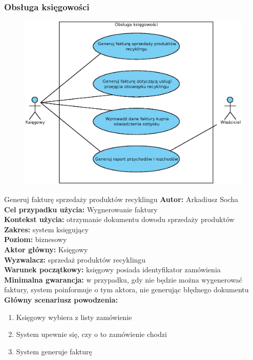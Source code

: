 \subsubsection{Obsługa księgowości}
	\begin{figure}[H]
		\centering
		\includegraphics[width=\textwidth]{img/UC/ksiegowosc.eps}
	\end{figure}

	\begin{usecase}{Generuj fakturę sprzedaży produktów recyklingu}
		\textbf{Autor:} Arkadiusz Socha\\
		\textbf{Cel przypadku użycia:} Wygnerowanie faktury \\
		\textbf{Kontekst użycia:} otrzymanie dokumentu dowodu sprzedaży produktów  \\
		\textbf{Zakres:} system księgujący \\
		\textbf{Poziom:} biznesowy \\
		\textbf{Aktor główny:} Księgowy \\
		\textbf{Wyzwalacz:} sprzedaż produktów recyklingu \\
		\textbf{Warunek początkowy:} księgowy posiada identyfikator zamówienia \\
		\textbf{Minimalna gwarancja:} w przypadku, gdy nie będzie można wygenerować faktury, system poinformuje o tym aktora, nie generując błędnego dokumentu \\
		\textbf{Główny scenariusz powodzenia:} 
			\begin{enumerate}
				\item Księgowy wybiera z listy zamówienie
				\item System upewnie się, czy o to zamówienie chodzi
				\item System generuje fakturę 
			\end{enumerate}
	\end{usecase}

